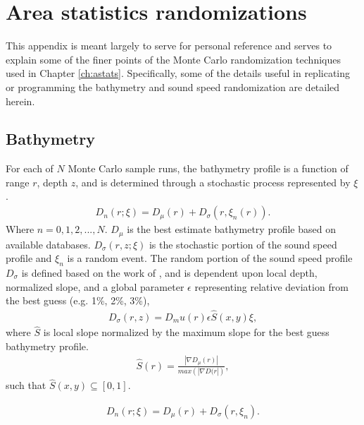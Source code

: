 \section{Area statistics randomizations}
%
This appendix is meant largely to serve for personal reference and
serves to explain some of the finer points of the Monte Carlo
randomization techniques used in Chapter
\ref{ch:astats}. Specifically, some of the details useful in
replicating or programming the bathymetry and sound speed
randomization are detailed herein.
\subsection{Bathymetry}
For each of $N$ Monte Carlo sample runs, the bathymetry profile is a
function of range $r$, depth $z$, and is determined through a
stochastic process represented by $\xi$.  
\begin{align*}
  D_n(r; \xi) = D_\mu(r) + D_\sigma(r,\xi_n(r)).%
\end{align*}
Where $n=0,1,2,...,N$. $D_\mu$ is the best estimate bathymetry profile
based on available databases. $D_\sigma(r,z;\xi)$ is the stochastic
portion of the sound speed profile and $\xi_n$ is a random event. The
random portion of the sound speed profile $D_\sigma$ is defined based
on the work of \cite{Lermusiaux2010}, and is dependent upon local
depth, normalized slope, and a global parameter $\epsilon$
representing relative deviation from the best guess (e.g. 1\%, 2\%, 3\%),
\begin{align*}
  D_\sigma(r,z)=D_mu(r)\epsilon\hat{S}(x,y)\xi,
\end{align*}
where $\hat{S}$ is local slope normalized by the maximum slope for the
best guess bathymetry profile.
\begin{align*}
  \hat{S}(r)=\frac{\left|\nabla D_\mu(r)\right|}{max(\left|\nabla D(r\right|)},
\end{align*}
such that $\hat{S}(x,y)\subseteq [0,1]$.

\begin{align*}
  D_n(r; \xi) = D_\mu(r) + D_\sigma(r,\xi_n).%
\end{align*}



%
